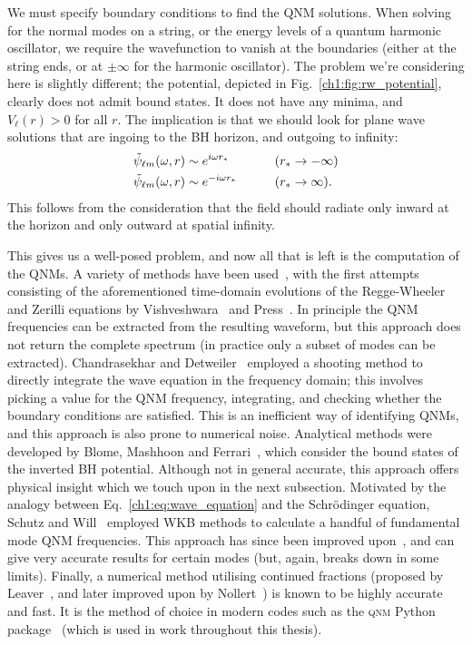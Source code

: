 We must specify boundary conditions to find the QNM solutions.
When solving for the normal modes on a string, or the energy levels of a quantum harmonic oscillator, we require the wavefunction to vanish at the boundaries (either at the string ends, or at $\pm \infty$ for the harmonic oscillator).
The problem we're considering here is slightly different; the potential, depicted in Fig.~\ref{ch1:fig:rw_potential}, clearly does not admit bound states. 
It does not have any minima, and $V_\ell(r) > 0$ for all $r$.
The implication is that we should look for plane wave solutions that are ingoing to the BH horizon, and outgoing to infinity:
\begin{alignat}{2}
    &\tilde{\psi}_{\ell m}(\omega, r) \sim e^{i \omega r_*} \qquad &&\qty(r_* \rightarrow -\infty) \nonumber \\
    &\tilde{\psi}_{\ell m}(\omega, r) \sim e^{- i \omega r_*} \qquad &&\qty(r_* \rightarrow \infty).
\end{alignat}
This follows from the consideration that the field should radiate only inward at the horizon and only outward at spatial infinity.

This gives us a well-posed problem, and now all that is left is the computation of the QNMs. 
A variety of methods have been used~\cite{Kokkotas:1999bd, Berti:2004md}, with the first attempts consisting of the aforementioned time-domain evolutions of the Regge-Wheeler and Zerilli equations by Vishveshwara~\cite{Vishveshwara:1970zz} and Press~\cite{Press:1971wr}. 
In principle the QNM frequencies can be extracted from the resulting waveform, but this approach does not return the complete spectrum (in practice only a subset of modes can be extracted).
Chandrasekhar and Detweiler~\cite{Chandrasekhar:1975zza} employed a shooting method to directly integrate the wave equation in the frequency domain; this involves picking a value for the QNM frequency, integrating, and checking whether the boundary conditions are satisfied. 
This is an inefficient way of identifying QNMs, and this approach is also prone to numerical noise.
Analytical methods were developed by Blome, Mashhoon and Ferrari~\cite{BLOME1984231, Ferrari:1984ozr, Ferrari:1984zz}, which consider the bound states of the inverted BH potential. 
Although not in general accurate, this approach offers physical insight which we touch upon in the next subsection.
Motivated by the analogy between Eq.~\ref{ch1:eq:wave_equation} and the Schr\"{o}dinger equation, Schutz and Will~\cite{Schutz:1985km} employed WKB methods to calculate a handful of fundamental mode QNM frequencies.
This approach has since been improved upon~\cite{Iyer:1986np, Matyjasek:2017psv, Konoplya:2019hlu}, 
and can give very accurate results for certain modes (but, again, breaks down in some limits). 
Finally, a numerical method utilising continued fractions (proposed by Leaver~\cite{Leaver:1985ax}, and later improved upon by Nollert~\cite{Nollert:1993zz}) is known to be highly accurate and fast.
It is the method of choice in modern codes such as the \textsc{qnm} Python package~\cite{Stein:2019mop} (which is used in work throughout this thesis).


